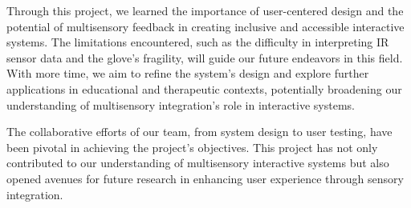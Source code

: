 \documentclass[11pt,a4paper]{report}
\begin{document}
\noindent Through this project, we learned the importance of user-centered design and the potential of multisensory feedback in creating inclusive and accessible interactive systems. The limitations encountered, such as the difficulty in interpreting IR sensor data and the glove's fragility, will guide our future endeavors in this field. With more time, we aim to refine the system's design and explore further applications in educational and therapeutic contexts, potentially broadening our understanding of multisensory integration's role in interactive systems.

\noindent The collaborative efforts of our team, from system design to user testing, have been pivotal in achieving the project's objectives. This project has not only contributed to our understanding of multisensory interactive systems but also opened avenues for future research in enhancing user experience through sensory integration.
\end{document}
